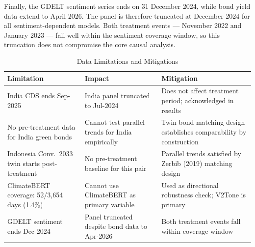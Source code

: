 \documentclass[12pt,a4paper]{article}
\begin{document}
Finally, the GDELT sentiment series ends on 31 December 2024, while bond yield data extend to April 2026. The panel is therefore truncated at December 2024 for all sentiment-dependent models. Both treatment events --- November 2022 and January 2023 --- fall well within the sentiment coverage window, so this truncation does not compromise the core causal analysis.

\begin{table}[H]
\caption{Data Limitations and Mitigations}
\label{tab:limitations}
\centering
\small
{}
\begin{tabular}{L{4.2cm} L{4.2cm} L{4.2cm}}
\toprule
{}
\textbf{Limitation} & \textbf{Impact} & \textbf{Mitigation} \\
\midrule
India CDS ends Sep-2025
  & India panel truncated to Jul-2024
  & Does not affect treatment period; acknowledged in results \\
No pre-treatment data for India green bonds
  & Cannot test parallel trends for India empirically
  & Twin-bond matching design establishes comparability by construction \\
Indonesia Conv.\ 2033 twin starts post-treatment
  & No pre-treatment baseline for this pair
  & Parallel trends satisfied by Zerbib (2019) matching design \\
ClimateBERT coverage: 52/3,654 days (1.4\%)
  & Cannot use ClimateBERT as primary variable
  & Used as directional robustness check; V2Tone is primary \\
GDELT sentiment ends Dec-2024
  & Panel truncated despite bond data to Apr-2026
  & Both treatment events fall within coverage window \\
\bottomrule
\end{tabular}
\end{table}
\end{document}
